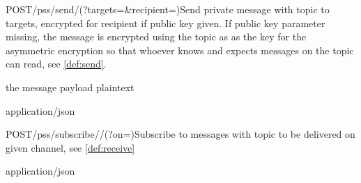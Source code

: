 
\begin{apiRoute}{POST}{/pss/send/(?targets=\&recipient=)}{Send private message with topic to targets, encrypted for recipient if public key given. If public key parameter missing, the message is encrypted using the topic as as the key for the asymmetric encryption so that whoever knows and expects messages on the topic can read,  see \ref{def:send}}. 
{
}
{ }

\begin{routeParameter} 
\end{routeParameter}
\begin{queryParameter} 
\end{queryParameter} 
\begin{headerParameter} 
\end{headerParameter}
\begin{requestBody}
the message payload plaintext
\end{requestBody}
\begin{routeResponse}{application/json}
\end{routeResponse}
\end{apiRoute}




\begin{apiRoute}{POST}{/pss/subscribe//(?on=)}{Subscribe to messages with topic to be delivered on given channel, see \ref{def:receive}}
{
}
{ }

\begin{routeParameter} 
\end{routeParameter}
\begin{queryParameter} 
\end{queryParameter} \begin{routeResponse}{application/json}
\end{routeResponse}
\end{apiRoute}

